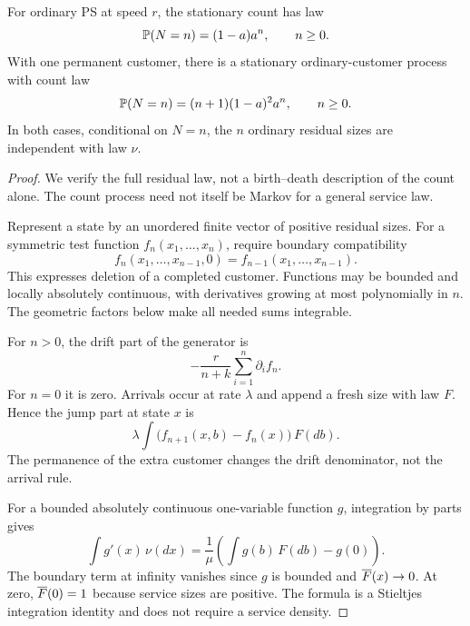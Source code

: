 \begin{lemma}\label{lem:ps-invariant}
For ordinary PS at speed $r$, the stationary count has law
\begin{equation}\label{eq:ordinary-count}
 \mathbb P(N=n)=(1-a)a^n,\qquad n\geq0.
\end{equation}
With one permanent customer, there is a stationary ordinary-customer process with count law
\begin{equation}\label{eq:permanent-count}
 \mathbb P(N=n)=(n+1)(1-a)^2a^n,\qquad n\geq0.
\end{equation}
In both cases, conditional on $N=n$, the $n$ ordinary residual sizes are independent with law $\nu$.
\end{lemma}
\begin{proof}
We verify the full residual law, not a birth--death description of the count alone. The count process need not itself be Markov for a general service law.

Represent a state by an unordered finite vector of positive residual sizes. For a symmetric test function $f_n(x_1,\ldots,x_n)$, require boundary compatibility
\begin{equation}\label{eq:boundary-test}
 f_n(x_1,\ldots,x_{n-1},0)=f_{n-1}(x_1,\ldots,x_{n-1}).
\end{equation}
This expresses deletion of a completed customer. Functions may be bounded and locally absolutely continuous, with derivatives growing at most polynomially in $n$. The geometric factors below make all needed sums integrable.

For $n>0$, the drift part of the generator is
\[
 -\frac r{n+k}\sum_{i=1}^n\partial_i f_n.
\]
For $n=0$ it is zero. Arrivals occur at rate $\lambda$ and append a fresh size with law $F$. Hence the jump part at state $x$ is
\[
 \lambda\int\bigl(f_{n+1}(x,b)-f_n(x)\bigr)\,F(db).
\]
The permanence of the extra customer changes the drift denominator, not the arrival rule.

For a bounded absolutely continuous one-variable function $g$, integration by parts gives
\begin{equation}\label{eq:residual-ibp}
 \int g'(x)\,\nu(dx)
   =\frac1\mu\left(\int g(b)\,F(db)-g(0)\right).
\end{equation}
The boundary term at infinity vanishes since $g$ is bounded and $\overline F(x)\to0$. At zero, $\overline F(0)=1$ because service sizes are positive. The formula is a Stieltjes integration identity and does not require a service density.


\end{proof}
